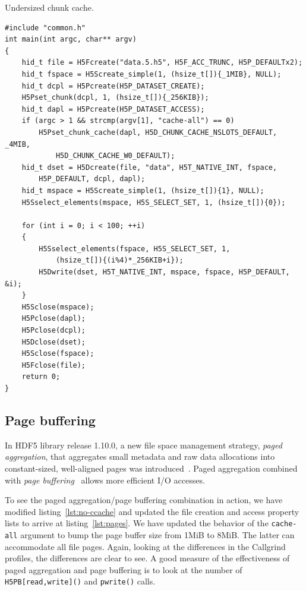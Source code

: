 \begin{listing}
\centering
\caption{Undersized chunk cache.}
\label{lst:no-ccache}
\begin{verbatim}
#include "common.h"
int main(int argc, char** argv)
{
    hid_t file = H5Fcreate("data.5.h5", H5F_ACC_TRUNC, H5P_DEFAULTx2);
    hid_t fspace = H5Screate_simple(1, (hsize_t[]){_1MIB}, NULL);
    hid_t dcpl = H5Pcreate(H5P_DATASET_CREATE);
    H5Pset_chunk(dcpl, 1, (hsize_t[]){_256KIB});
    hid_t dapl = H5Pcreate(H5P_DATASET_ACCESS);
    if (argc > 1 && strcmp(argv[1], "cache-all") == 0)
        H5Pset_chunk_cache(dapl, H5D_CHUNK_CACHE_NSLOTS_DEFAULT, _4MIB,
            H5D_CHUNK_CACHE_W0_DEFAULT);
    hid_t dset = H5Dcreate(file, "data", H5T_NATIVE_INT, fspace,
        H5P_DEFAULT, dcpl, dapl);
    hid_t mspace = H5Screate_simple(1, (hsize_t[]){1}, NULL);
    H5Sselect_elements(mspace, H5S_SELECT_SET, 1, (hsize_t[]){0});
    
    for (int i = 0; i < 100; ++i)
    {
        H5Sselect_elements(fspace, H5S_SELECT_SET, 1,
            (hsize_t[]){(i%4)*_256KIB+i});
        H5Dwrite(dset, H5T_NATIVE_INT, mspace, fspace, H5P_DEFAULT, &i);
    }
    H5Sclose(mspace);
    H5Pclose(dapl);     
    H5Pclose(dcpl);  
    H5Dclose(dset);
    H5Sclose(fspace);
    H5Fclose(file);
    return 0;
}
\end{verbatim}
\end{listing}

\subsection{Page buffering}\label{sub-sec:page-buf}

In HDF5 library release 1.10.0, a new file space management strategy, \textit{paged aggregation}, that aggregates small metadata and raw data allocations into constant-sized, well-aligned pages was introduced~\cite{rfc20120523}. Paged aggregation combined with \textit{page buffering}~\cite{rfc20150709} allows more efficient I/O accesses.

To see the paged aggregation/page buffering combination in action, we have modified listing~\ref{lst:no-ccache} and updated the file creation and access property lists to arrive at listing~\ref{lst:pages}. We have updated the behavior of the \texttt{cache-all} argument to bump the page buffer size from 1MiB to 8MiB. The latter can accommodate all file pages. Again, looking at the differences in the Callgrind profiles, the differences are clear to see. A good measure of the effectiveness of paged aggregation and page buffering is to look at the number of \texttt{H5PB[read,write]()} and \texttt{pwrite()} calls.


